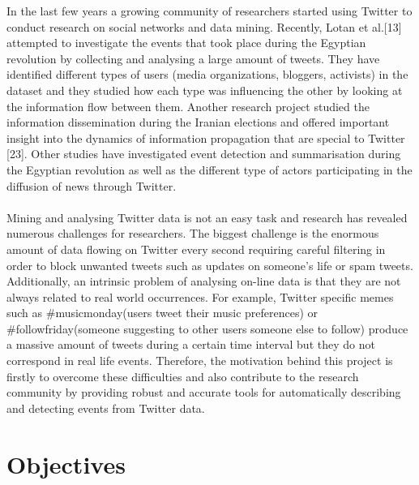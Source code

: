 In the last few years a growing community of researchers started using Twitter to conduct research on social networks 
and data mining. Recently, Lotan et al.[13] attempted to investigate the events that took place during the
Egyptian revolution by collecting and analysing a large amount of tweets. They have identified different types
of users (media organizations, bloggers, activists) in the dataset and they studied how each type was influencing
the other by looking at the information flow between them. Another research project studied the information
dissemination during the Iranian elections and offered important insight into the dynamics of information propagation 
that are special to Twitter [23]. Other studies have investigated event detection and summarisation during
the Egyptian revolution as well as the different type of actors participating in the diffusion of news through Twitter.\\\\
Mining and analysing Twitter data is not an easy task and research has revealed numerous challenges for researchers.
The biggest challenge is the enormous amount of data flowing on Twitter every second requiring careful filtering in
order to block unwanted tweets such as updates on someone's life or spam tweets. Additionally, an intrinsic problem
of analysing on-line data is that they are not always related to real world occurrences. For example, Twitter specific
memes such as \#musicmonday(users tweet their music preferences) or \#followfriday(someone suggesting to other
users someone else to follow) produce a massive amount of tweets during a certain time interval but they do not
correspond in real life events.
Therefore, the motivation behind this project is firstly to overcome these difficulties and also contribute to the
research community by providing robust and accurate tools for automatically describing and detecting events from Twitter data. 

\section{Objectives}

